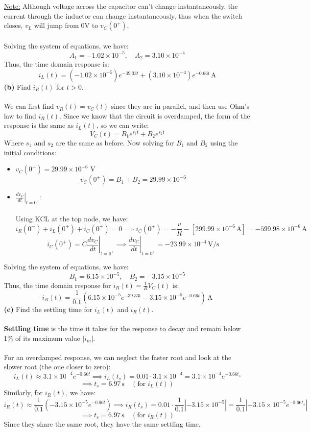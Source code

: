 \documentclass[12pt]{article}
\begin{document}
\underline{Note:} Although voltage across the capacitor can't change instantaneously, the current through the inductor can change instantaneously, thus when the switch closes, $v_L$ will jump from 0V to $v_C(0^+)$.\\\\
Solving the system of equations, we have:
\[A_1 = -1.02\times10^{-5},\quad A_2 = 3.10\times10^{-4}\]
Thus, the time domain response is:
\[\boxed{i_L(t) = (-1.02\times10^{-5})e^{-39.33t} + (3.10\times10^{-4})e^{-0.66t}\,\text{A}}\]
\textbf{(b)} Find $i_R(t)$ for $t>0$.\\\\
We can first find $v_R(t)=v_C(t)$ since they are in parallel, and then use Ohm's law to find $i_R(t)$. Since we know that the circuit is overdamped, the form of the response is the same as $i_L(t)$, so we can write:
\[V_C(t) = B_1e^{s_1t} + B_2e^{s_2t}\]
Where $s_1$ and $s_2$ are the same as before. Now solving for $B_1$ and $B_2$ using the initial conditions:
\begin{itemize}
    \item $v_C(0^+) = 29.99\times10^{-6}$ V
    \[ v_C(0^+) = B_1 + B_2 = 29.99\times10^{-6} \]
    \item $ \left.\frac{dv_C}{dt}\right|_{t=0^+} $:\\\\
    Using KCL at the top node, we have:
    \[i_R(0^+) + i_L(0^+) + i_C(0^+) = 0\implies i_C(0^+) = -\frac{v}{R}-[299.99\times10^{-6}\,\text{A}] = -599.98\times10^{-6}\,\text{A}\]
    \[i_C(0^+) = C\left.\frac{dv_C}{dt}\right|_{t=0^+}\implies \left.\frac{dv_C}{dt}\right|_{t=0^+} = -23.99\times10^{-4}\,\text{V/s}\]
\end{itemize}
Solving the system of equations, we have:
\[B_1 = 6.15\times10^{-5},\quad B_2 = -3.15\times10^{-5}\]
Thus, the time domain response for $i_R(t) = \frac{1}{R}V_C(t)$ is:
\[\boxed{i_R(t)=\frac{1}{0.1}\left(6.15\times10^{-5}e^{-39.33t} - 3.15\times10^{-5}e^{-0.66t}\right)\,\text{A}}\]
\textbf{(c)} Find the settling time for $i_L(t)$ and $i_R(t)$.\\\\
\textbf{Settling time} is the time it takes for the response to decay and remain below 1\% of its maximum value $|i_m|$.\\\\
For an overdamped response, we can neglect the faster root and look at the slower root (the one closer to zero):
\[i_L(t)\approx 3.1\times10^{-4}e^{-0.66t}\implies i_L(t_s) = 0.01\cdot3.1\times10^{-4}=3.1\times10^{-4}e^{-0.66t_s}\]
\[\implies \boxed{t_s = 6.97\,\text{s}\quad (\text{for }i_L(t))}\]
Similarly, for $i_R(t)$, we have:
\[i_R(t)\approx \frac{1}{0.1}\left(-3.15\times10^{-5}e^{-0.66t}\right)\implies i_R(t_s) = 0.01\cdot\frac{1}{0.1}\left|-3.15\times10^{-5}\right|=\frac{1}{0.1}\left|-3.15\times10^{-5}e^{-0.66t_s}\right|\]
\[\implies \boxed{t_s = 6.97\,\text{s}\quad (\text{for }i_R(t))}\]
Since they share the same root, they have the same settling time.
\end{document}
